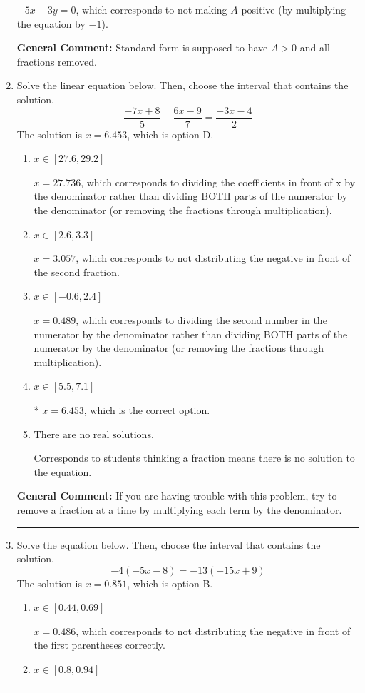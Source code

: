\documentclass{extbook}[14pt]
\newcommand{\litem}[1]{\item #1

\rule{\textwidth}{0.4pt}}
\begin{document}
\begin{enumerate}
{\begin{enumerate}[label=\Alph*.]
 $-5x - 3y = 0$, which corresponds to not making $A$ positive (by multiplying the equation by $-1$).
\end{enumerate}

\textbf{General Comment:} Standard form is supposed to have $A > 0$ and all fractions removed.
}
\litem{
Solve the linear equation below. Then, choose the interval that contains the solution.
\[ \frac{-7x + 8}{5} - \frac{6x -9}{7} = \frac{-3x -4}{2} \]The solution is \( x = 6.453 \), which is option D.\begin{enumerate}[label=\Alph*.]
\item \( x \in [27.6, 29.2] \)

 $x = 27.736$, which corresponds to dividing the coefficients in front of x by the denominator rather than dividing BOTH parts of the numerator by the denominator (or removing the fractions through multiplication).
\item \( x \in [2.6, 3.3] \)

 $x = 3.057$, which corresponds to not distributing the negative in front of the second fraction.
\item \( x \in [-0.6, 2.4] \)

 $x = 0.489$, which corresponds to dividing the second number in the numerator by the denominator rather than dividing BOTH parts of the numerator by the denominator (or removing the fractions through multiplication).
\item \( x \in [5.5, 7.1] \)

* $x = 6.453$, which is the correct option.
\item \( \text{There are no real solutions.} \)

Corresponds to students thinking a fraction means there is no solution to the equation.
\end{enumerate}

\textbf{General Comment:} If you are having trouble with this problem, try to remove a fraction at a time by multiplying each term by the denominator.
}
\litem{
Solve the equation below. Then, choose the interval that contains the solution.
\[ -4(-5x -8) = -13(-15x + 9) \]The solution is \( x = 0.851 \), which is option B.\begin{enumerate}[label=\Alph*.]
\item \( x \in [0.44, 0.69] \)

$x = 0.486$, which corresponds to not distributing the negative in front of the first parentheses correctly.
\item \( x \in [0.8, 0.94] \)


\end{enumerate}}
\end{enumerate}
\end{document}
